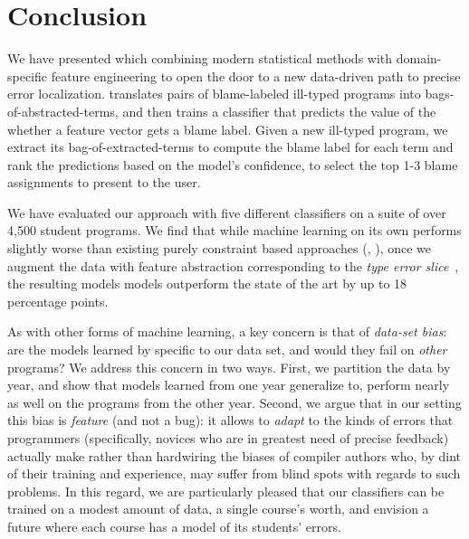 \section{Conclusion}
\label{sec:conclusion}

We have presented \toolname which
combining modern statistical methods
with domain-specific feature engineering
to open the door to a new data-driven
path to precise error localization.
%
\toolname
translates pairs of
blame-labeled ill-typed
programs into bags-of-abstracted-terms,
and then trains a classifier that
predicts the value of the
whether a feature vector gets
a blame label.
%
Given a new ill-typed program,
we extract its bag-of-extracted-terms
to compute the blame label for each
term and rank the predictions based
on the model's confidence, to select
the top 1-3 blame assignments to
present to the user.

We have evaluated our approach with
five different classifiers on a suite
of over 4,500 student programs.
We find that while machine
learning on its own performs slightly worse
than existing purely constraint based
approaches (\eg \ocaml, \sherrloc), once
we augment the data with feature abstraction
corresponding to the \emph{type error slice}~\cite{Tip2001-qp},
the resulting models models outperform
the state of the art by up to 18
percentage points.


As with other forms of machine learning,
a key concern is that of \emph{data-set bias}: are
the models learned by \toolname specific
to our data set, and would they fail on
\emph{other} \ocaml programs?
%
We address this concern in two ways.
%
First, we partition the data by year,
and show that models learned from one
year generalize to, \ie perform nearly
as well on the programs from the other
year.
%
Second, we argue that in our setting
this bias is \emph{feature} (and not
a bug): it allows \toolname to \emph{adapt}
to the kinds of errors that programmers
(specifically, novices who are in greatest
need of precise feedback) actually make
rather than hardwiring the biases of
compiler authors who, by dint of their
training and experience, may suffer from
blind spots with regards to such problems.
%
In this regard, we are particularly pleased
that our classifiers can be trained on a
modest amount of data, \eg a single course's
worth, and envision a future where each course
has a model of its students' errors.



